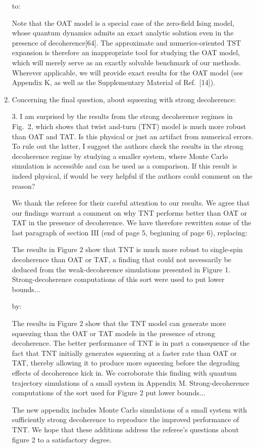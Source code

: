 \documentclass[preprint,superscriptaddress]{revtex4-2}
\newcommand{\1}{\mathds{1}}
\newcommand{\blue}[1]{{\color{blue} #1}}
\newcommand{\red}[1]{{\color{red} #1}}
\newcommand{\green}[1]{{\color{ForestGreen} #1}}
\begin{document}
\begin{enumerate}
  to:

  \green{Note that the OAT model is a special case of the zero-field
    Ising model, whose quantum dynamics admits an exact analytic
    solution even in the presence of decoherence[64].  The approximate
    and numerics-oriented TST expansion is therefore an inappropriate
    tool for studying the OAT model, which will merely serve as an
    exactly solvable benchmark of our methods.  Wherever applicable,
    we will provide exact results for the OAT model (see Appendix K,
    as well as the Supplementary Material of Ref.~[14]).}


\item Concerning the final question, about squeezing with strong
  decoherence:

  \blue{3. I am surprised by the results from the strong decoherence
    regimes in Fig.~2, which shows that twist and-turn (TNT) model is
    much more robust than OAT and TAT. Is this physical or just an
    artifact from numerical errors. To rule out the latter, I suggest
    the authors check the results in the strong decoherence regime by
    studying a smaller system, where Monte Carlo simulation is
    accessible and can be used as a comparison. If this result is
    indeed physical, if would be very helpful if the authors could
    comment on the reason?}

  We thank the referee for their careful attention to our results.  We
  agree that our findings warrant a comment on why TNT performs better
  than OAT or TAT in the presence of decoherence.  We have therefore
  rewritten some of the last paragraph of section III (end of page 5,
  beginning of page 6), replacing:

  \red{The results in Figure 2 show that TNT is much more robust to
    single-spin decoherence than OAT or TAT, a finding that could not
    necessarily be deduced from the weak-decoherence simulations
    presented in Figure 1.  Strong-decoherence computations of this
    sort were used to put lower bounds...}

  by:

  \green{The results in Figure 2 show that the TNT model can generate
    more squeezing than the OAT or TAT models in the presence of
    strong decoherence.  The better performance of TNT is in part a
    consequence of the fact that TNT initially generates squeezing at
    a faster rate than OAT or TAT, thereby allowing it to produce more
    squeezing before the degrading effects of decoherence kick in.  We
    corroborate this finding with quantum trajectory simulations of a
    small system in Appendix M.  Strong-decoherence computations of
    the sort used for Figure 2 put lower bounds...}

  The new appendix includes Monte Carlo simulations of a small system
  with sufficiently strong decoherence to reproduce the improved
  performance of TNT.  We hope that these additions address the
  referee's questions about figure 2 to a satisfactory degree.

\end{enumerate}
\end{document}
